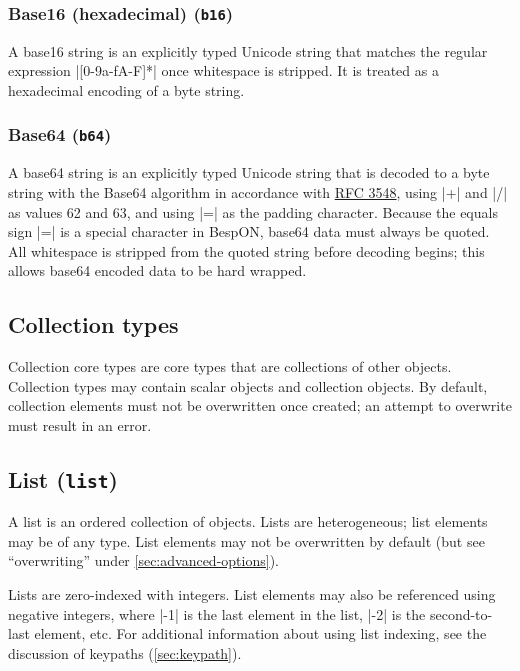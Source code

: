 \documentclass[11pt]{article}
\newcommand{\bespon}{BespON}
\begin{document}
\subsubsection{Base16 (hexadecimal) (\texttt{b16})}

A base16 string is an explicitly typed Unicode string that matches the regular expression |[0-9a-fA-F]*| once whitespace is stripped.  It is treated as a hexadecimal encoding of a byte string.


\subsubsection{Base64 (\texttt{b64})}

A base64 string is an explicitly typed Unicode string that is decoded to a byte string with the Base64 algorithm in accordance with \href{https://tools.ietf.org/html/rfc3548}{RFC 3548}, using |+| and |/| as values 62 and 63, and using |=| as the padding character.  Because the equals sign |=| is a special character in \bespon, base64 data must always be quoted.  All whitespace is stripped from the quoted string before decoding begins; this allows base64 encoded data to be hard wrapped.


\subsection{Collection types}

Collection core types are core types that are collections of other objects.  Collection types may contain scalar objects and collection objects.  By default, collection elements must not be overwritten once created; an attempt to overwrite must result in an error.

\subsection{List (\texttt{list})}

A list is an ordered collection of objects.  Lists are heterogeneous; list elements may be of any type.  List elements may not be overwritten by default (but see ``overwriting'' under \cref{sec:advanced-options}).

Lists are zero-indexed with integers.  List elements may also be referenced using negative integers, where |-1| is the last element in the list, |-2| is the second-to-last element, etc.  For additional information about using list indexing, see the discussion of keypaths (\cref{sec:keypath}).
\end{document}

